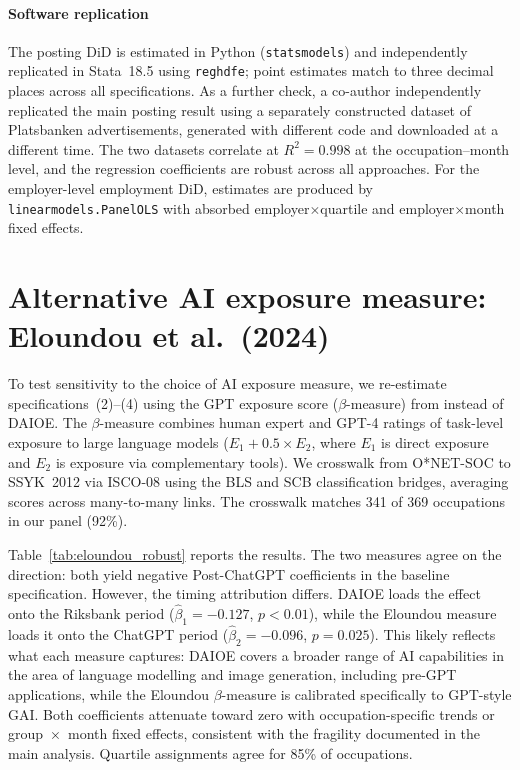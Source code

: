 \documentclass[preprint,12pt,authoryear]{elsarticle}
\begin{document}


\paragraph{Software replication} The posting DiD is estimated in Python (\texttt{statsmodels}) and independently replicated in Stata~18.5 using \texttt{reghdfe}; point estimates match to three decimal places across all specifications. As a further check, a co-author independently replicated the main posting result using a separately constructed dataset of Platsbanken advertisements, generated with different code and downloaded at a different time. The two datasets correlate at $R^2 = 0.998$ at the occupation--month level, and the regression coefficients are robust across all approaches. For the employer-level employment DiD, estimates are produced by \texttt{linearmodels.PanelOLS} with absorbed employer$\times$quartile and employer$\times$month fixed effects.


\section{Alternative AI exposure measure: Eloundou et al.\ (2024)}
\label{sec:posting_eloundou}

To test sensitivity to the choice of AI exposure measure, we re-estimate specifications~(2)--(4) using the GPT exposure score ($\beta$-measure) from \citet{eloundou2024gpts} instead of DAIOE. The $\beta$-measure combines human expert and GPT-4 ratings of task-level exposure to large language models ($E_1 + 0.5 \times E_2$, where $E_1$ is direct exposure and $E_2$ is exposure via complementary tools). We crosswalk from O*NET-SOC to SSYK~2012 via ISCO-08 using the BLS and SCB classification bridges, averaging scores across many-to-many links. The crosswalk matches 341 of 369 occupations in our panel (92\%).

Table~\ref{tab:eloundou_robust} reports the results. The two measures agree on the direction: both yield negative Post-ChatGPT coefficients in the baseline specification. However, the timing attribution differs. DAIOE loads the effect onto the Riksbank period ($\hat\beta_1 = -0.127$, $p < 0.01$), while the Eloundou measure loads it onto the ChatGPT period ($\hat\beta_2 = -0.096$, $p = 0.025$). This likely reflects what each measure captures: DAIOE covers a broader range of AI capabilities in the area of language modelling and image generation, including pre-GPT applications, while the Eloundou $\beta$-measure is calibrated specifically to GPT-style GAI. Both coefficients attenuate toward zero with occupation-specific trends or group~$\times$~month fixed effects, consistent with the fragility documented in the main analysis. Quartile assignments agree for 85\% of occupations.
\end{document}
